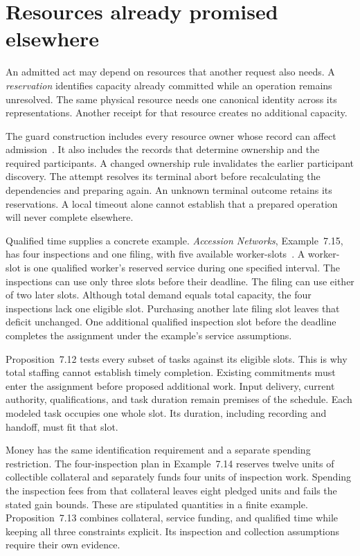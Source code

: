 \documentclass{momentum}
\begin{document}
\section{Resources already promised elsewhere}
\label{sec:resources}

An admitted act may depend on resources that another request also needs.
A \emph{reservation} identifies capacity already committed while an operation remains unresolved.
The same physical resource needs one canonical identity across its representations.
Another receipt for that resource creates no additional capacity.

The guard construction includes every resource owner whose record can affect admission~\cite[Section~5.1]{sjn}.
It also includes the records that determine ownership and the required participants.
A changed ownership rule invalidates the earlier participant discovery.
The attempt resolves its terminal abort before recalculating the dependencies and preparing again.
An unknown terminal outcome retains its reservations.
A local timeout alone cannot establish that a prepared operation will never complete elsewhere.

Qualified time supplies a concrete example.
\emph{Accession Networks}, Example~7.15, has four inspections and one filing, with five available worker-slots~\cite{accession}.
A worker-slot is one qualified worker's reserved service during one specified interval.
The inspections can use only three slots before their deadline.
The filing can use either of two later slots.
Although total demand equals total capacity, the four inspections lack one eligible slot.
Purchasing another late filing slot leaves that deficit unchanged.
One additional qualified inspection slot before the deadline completes the assignment under the example's service assumptions.

Proposition~7.12 tests every subset of tasks against its eligible slots.
This is why total staffing cannot establish timely completion.
Existing commitments must enter the assignment before proposed additional work.
Input delivery, current authority, qualifications, and task duration remain premises of the schedule.
Each modeled task occupies one whole slot.
Its duration, including recording and handoff, must fit that slot.

Money has the same identification requirement and a separate spending restriction.
The four-inspection plan in Example~7.14 reserves twelve units of collectible collateral and separately funds four units of inspection work.
Spending the inspection fees from that collateral leaves eight pledged units and fails the stated gain bounds.
These are stipulated quantities in a finite example.
Proposition~7.13 combines collateral, service funding, and qualified time while keeping all three constraints explicit.
Its inspection and collection assumptions require their own evidence.
\end{document}

